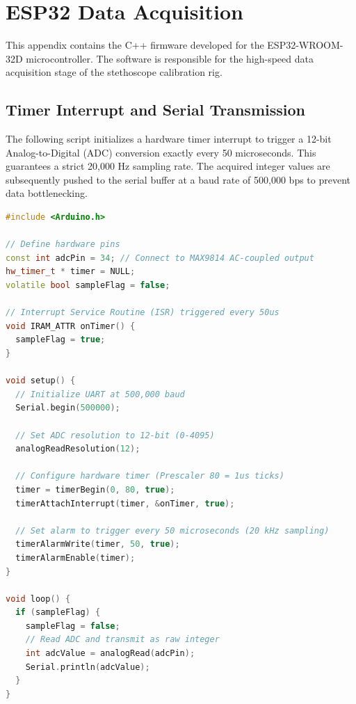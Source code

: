 \appendix

\chapter{ESP32 Data Acquisition}

This appendix contains the C++ firmware developed for the ESP32-WROOM-32D microcontroller. The software is responsible for the high-speed data acquisition stage of the stethoscope calibration rig.

\section{Timer Interrupt and Serial Transmission}

The following script initializes a hardware timer interrupt to trigger a 12-bit Analog-to-Digital (ADC) conversion exactly every 50 microseconds. This guarantees a strict 20,000 Hz sampling rate. The acquired integer values are subsequently pushed to the serial buffer at a baud rate of 500,000 bps to prevent data bottlenecking.

\begin{lstlisting}[language=C++, caption={ESP32 firmware for 20 kHz hardware timer ADC sampling and high-speed UART transmission.}, label={lst:esp32_firmware}]
#include <Arduino.h>

// Define hardware pins
const int adcPin = 34; // Connect to MAX9814 AC-coupled output
hw_timer_t * timer = NULL;
volatile bool sampleFlag = false;

// Interrupt Service Routine (ISR) triggered every 50us
void IRAM_ATTR onTimer() {
  sampleFlag = true;
}

void setup() {
  // Initialize UART at 500,000 baud
  Serial.begin(500000);
  
  // Set ADC resolution to 12-bit (0-4095)
  analogReadResolution(12);
  
  // Configure hardware timer (Prescaler 80 = 1us ticks)
  timer = timerBegin(0, 80, true);
  timerAttachInterrupt(timer, &onTimer, true);
  
  // Set alarm to trigger every 50 microseconds (20 kHz sampling)
  timerAlarmWrite(timer, 50, true);
  timerAlarmEnable(timer);
}

void loop() {
  if (sampleFlag) {
    sampleFlag = false;
    // Read ADC and transmit as raw integer
    int adcValue = analogRead(adcPin);
    Serial.println(adcValue);
  }
}
\end{lstlisting}